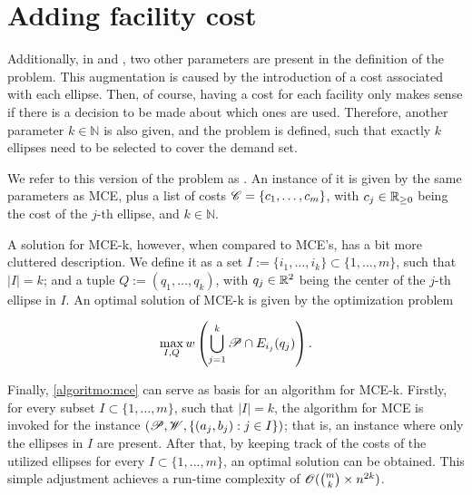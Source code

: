 \section{Adding facility cost}

Additionally, in  and , two other parameters are present in the definition of the problem. This augmentation is caused by the introduction of a cost associated with each ellipse. Then, of course, having a cost for each facility only makes sense if there is a decision to be made about which ones are used. Therefore, another parameter $k\in\mathbb{N}$ is also given, and the problem is defined, such that exactly $k$ ellipses need to be selected to cover the demand set.

We refer to this version of the problem as  . An instance of it is given by the same parameters as MCE, plus a list of costs $\mathscr{C}=\{c_1, \dots, c_m\}$, with $c_j\in\mathbb{R}_{\ge0}$ being the cost of the $j$-th ellipse, and $k\in\mathbb{N}$.

 A solution for MCE-k, however,  when compared to MCE's, has a bit more cluttered description. We define it as a set $I:=\{i_1, \dots, i_k\}\subset\{1, \dots, m\}$, such that $|I|=k$; and a tuple $Q:=(q_1, \dots, q_k)$, with $q_j\in\mathbb{R}^2$ being the center of the $j$-th ellipse in $I$. An optimal solution of MCE-k is given by the optimization problem

\begin{equation}
\max_{I, Q} w\left(\bigcup_{j=1}^k \mathscr{P} \cap E_{i_j}(q_j)\right).
\end{equation}

Finally, \autoref{algoritmo:mce} can serve as basis for an algorithm for MCE-k. 
Firstly, for every subset $I \subset \{1, \dots, m\}$, such that $|I| = k$, the algorithm for MCE is invoked for the instance $(\mathscr{P}, \mathscr{W}, \{(a_j, b_j) : j \in I\})$; that is, an instance where only the ellipses in $I$ are present.
After that, by keeping track of the costs of the utilized ellipses for every $I \subset \{1, \dots, m\}$, an optimal solution can be obtained.
This simple adjustment achieves a run-time complexity of $\mathscr{O}(\binom{m}{k} \times n^{2k})$. 

